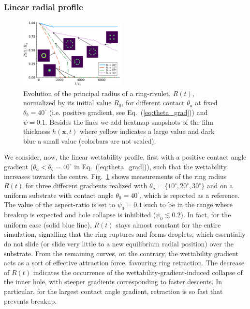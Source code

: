 \documentclass[%
 aip,
 amsmath,amssymb,
 reprint,%
]{revtex4-1}
\begin{document}
\subsubsection{Linear radial profile}\label{subsubsec:linwettgrad}
\begin{figure}
    \centering
    \includegraphics[width=0.48\textwidth]{Figure_7.pdf}
    \caption{Evolution of the principal radius of a ring-rivulet, $R(t)$, normalized by its initial value $R_0$, for different contact $\theta_a$ at fixed $\theta_b = 40^{\circ}$ (i.e. positive gradient, see Eq.~(\ref{eq:theta_grad})) and $\psi = 0.1$.
    Besides the lines we add heatmap snapshots of the film thickness $h(\mathbf{x},t)$ where yellow indicates a large value and dark blue a small value (colorbars are not scaled).}
    \label{fig:negativewetgrad}
\end{figure}
We consider, now, the linear wettability profile, first with a positive contact angle gradient ($\theta_a < \theta_b=40^{\circ}$ in Eq.~(\ref{eq:theta_grad})), such that the wettability increases towards the centre. 
Fig.~\ref{fig:negativewetgrad} shows measurements of the ring radius $R(t)$ for three different gradients realized with $\theta_a = \{ 10^{\circ}, 20^{\circ}, 30^{\circ} \}$ and on a uniform substrate with contact angle $\theta_0 = 40^{\circ}$, which is reported as a reference. 
The value of the aspect-ratio is set to $\psi_0 = 0.1$ such to be in the range where breakup is expected and hole collapse is inhibited ($\psi_0 \lesssim 0.2$).
In fact, for the uniform case (solid blue line), $R(t)$ stays almost constant for the entire simulation, signalling that the ring ruptures and forms droplets, which essentially do not slide (or slide very little to a new equilibrium radial position) over the substrate.
From the remaining curves, on the contrary, the wettability gradient acts as a sort of effective attraction force, favouring ring retraction.
The decrease of $R(t)$ indicates the occurrence of the wettability-gradient-induced collapse of the inner hole, with steeper gradients corresponding to faster descents.
In particular, for the largest contact angle gradient, retraction is so fast that prevents breakup. 
\end{document}
